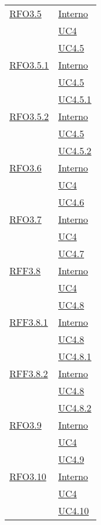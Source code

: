 \begin{longtable}{|>{\centering}m{5cm}|m{5cm}<{\centering}|}
\hyperlink{RFO3.5}{RFO3.5} &  \hyperlink{Interno}{Interno}\\ &\hyperref[UC4]{UC4}\\ &\hyperref[UC4.5]{UC4.5}\\ \hline

\hyperlink{RFO3.5.1}{RFO3.5.1} &  \hyperlink{Interno}{Interno}\\ &\hyperref[UC4.5]{UC4.5}\\ &\hyperref[UC4.5.1]{UC4.5.1}\\ \hline

\hyperlink{RFO3.5.2}{RFO3.5.2} & \hyperlink{Interno}{Interno}\\ &\hyperref[UC4.5]{UC4.5}\\ &\hyperref[UC4.5.2]{UC4.5.2}\\ \hline

\hyperlink{RFO3.6}{RFO3.6} &   \hyperlink{Interno}{Interno}\\ &\hyperref[UC4]{UC4}\\ &\hyperref[UC4.6]{UC4.6}\\ \hline

\hyperlink{RFO3.7}{RFO3.7} & \hyperlink{Interno}{Interno}\\ &\hyperref[UC4]{UC4}\\ &\hyperref[UC4.7]{UC4.7}\\ \hline

\hyperlink{RFF3.8}{RFF3.8} &  \hyperlink{Interno}{Interno}\\ &\hyperref[UC4]{UC4}\\ &\hyperref[UC4.8]{UC4.8}\\ \hline

\hyperlink{RFF3.8.1}{RFF3.8.1} &   \hyperlink{Interno}{Interno}\\ &\hyperref[UC4.8]{UC4.8}\\ &\hyperref[UC4.8.1]{UC4.8.1}\\ \hline

\hyperlink{RFF3.8.2}{RFF3.8.2} &  \hyperlink{Interno}{Interno}\\ &\hyperref[UC4.8]{UC4.8}\\ &\hyperref[UC4.8.2]{UC4.8.2}\\ \hline

\hyperlink{RFO3.9}{RFO3.9} &  \hyperlink{Interno}{Interno}\\ &\hyperref[UC4]{UC4}\\ &\hyperref[UC4.9]{UC4.9}\\ \hline

\hyperlink{RFO3.10}{RFO3.10} &   \hyperlink{Interno}{Interno}\\ &\hyperref[UC4]{UC4}\\ &\hyperref[UC4.10]{UC4.10}\\ \hline


\end{longtable}
